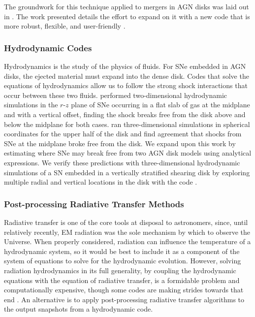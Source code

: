 The groundwork for this technique applied to mergers in AGN disks was laid out in \citet{McKernan+20a,McKernan+20b}.
The work presented details the effort to expand on it with a new code that is more robust, flexible, and user-friendly \citep{McKernan+25-mcfactsI,Cook+25,Delfavero+25-mcfactsIII,McPike+26-mcfactsIV}.

\subsubsection{Hydrodynamic Codes}

Hydrodynamics is the study of the physics of fluids.
For SNe embedded in AGN disks, the ejected material must expand into the dense disk.
Codes that solve the equations of hydrodynamics allow us to follow the strong shock interactions that occur between these two fluids.
\citet{Grishin+21} performed two-dimensional hydrodynamic simulations in the $r$-$z$ plane of SNe occurring in a flat slab of gas at the midplane and with a vertical offset, finding the shock breaks free from the disk above and below the midplane for both cases.
\citet{Moranchel+21} ran three-dimensional simulations in spherical coordinates for the upper half of the disk and find agreement that shocks from SNe at the midplane broke free from the disk.
We expand upon this work by estimating where SNe may break free from two AGN disk models using analytical expressions.
We verify these predictions with three-dimensional hydrodynamic simulations of a SN embedded in a vertically stratified shearing disk by exploring multiple radial and vertical locations in the disk with the  code \citep{Stone+08,StoneGardiner10}.

\subsubsection{Post-processing Radiative Transfer Methods}
Radiative transfer is one of the core tools at disposal to astronomers, since, until relatively recently, EM radiation was the sole mechanism by which to observe the Universe.
When properly considered, radiation can influence the temperature of a hydrodynamic system, so it would be best to include it as a component of the system of equations to solve for the hydrodynamic evolution.
However, solving radiation hydrodynamics in its full generality, by coupling the hydrodynamic equations with the equation of radiative transfer, is a formidable problem and computationally expensive, though some codes are making strides towards that end \citep[e.g.,][]{Jiang+14,White+23}.
An alternative is to apply post-processing radiative transfer algorithms to the output snapshots from a hydrodynamic code.

